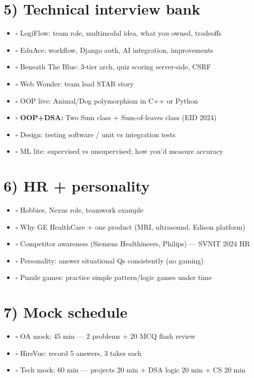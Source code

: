 \documentclass[a4paper,9pt]{extarticle}
\begin{document}
\section{5) Technical interview bank}
\begin{itemize}
  \item $\square$ LogiFlow: team role, multimodal idea, what you owned, tradeoffs
  \item $\square$ EduAce: workflow, Django auth, AI integration, improvements
  \item $\square$ Beneath The Blue: 3-tier arch, quiz scoring server-side, CSRF
  \item $\square$ Web Wonder: team lead STAR story
  \item $\square$ OOP live: Animal/Dog polymorphism in C++ or Python
  \item $\square$ \textbf{OOP+DSA:} Two Sum class + Sum-of-leaves class (EID 2024)
  \item $\square$ Design: testing software / unit vs integration tests
  \item $\square$ ML lite: supervised vs unsupervised; how you'd measure accuracy
\end{itemize}

\section{6) HR + personality}
\begin{itemize}
  \item $\square$ Hobbies, Nexus role, teamwork example
  \item $\square$ Why GE HealthCare + one product (MRI, ultrasound, Edison platform)
  \item $\square$ Competitor awareness (Siemens Healthineers, Philips) --- SVNIT 2024 HR
  \item $\square$ Personality: answer situational Qs consistently (no gaming)
  \item $\square$ Puzzle games: practice simple pattern/logic games under time
\end{itemize}

\section{7) Mock schedule}
\begin{itemize}
  \item $\square$ OA mock: 45 min --- 2 problems + 20 MCQ flash review
  \item $\square$ HireVue: record 5 answers, 3 takes each
  \item $\square$ Tech mock: 60 min --- projects 20 min + DSA logic 20 min + CS 20 min
\end{itemize}
\end{document}
